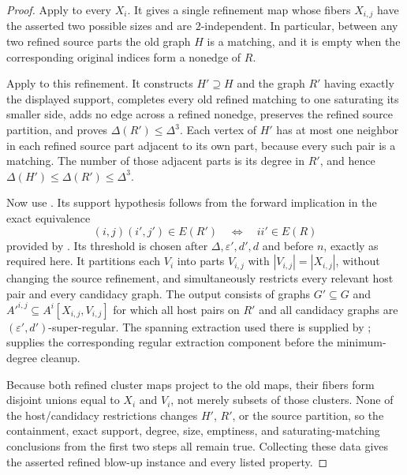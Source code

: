\begin{proof}
Apply  to every $X_i$.  It gives a single refinement map whose fibers $X_{i,j}$ have the asserted two possible sizes and are $2$-independent.  In particular, between any two refined source parts the old graph $H$ is a matching, and it is empty when the corresponding original indices form a nonedge of $R$.

Apply  to this refinement.  It constructs $H'\supseteq H$ and the graph $R'$ having exactly the displayed support, completes every old refined matching to one saturating its smaller side, adds no edge across a refined nonedge, preserves the refined source partition, and proves $\Delta(R')\leq\Delta^3$.  Each vertex of $H'$ has at most one neighbor in each refined source part adjacent to its own part, because every such pair is a matching.  The number of those adjacent parts is its degree in $R'$, and hence $\Delta(H')\leq\Delta(R')\leq\Delta^3$.

Now use .  Its support hypothesis follows from the forward implication in the exact equivalence
\[
 (i,j)(i',j')\in E(R')\quad\Longleftrightarrow\quad ii'\in E(R)
\]
provided by .  Its threshold is chosen after $\Delta,\varepsilon',d',d$ and before $n$, exactly as required here.  It partitions each $V_i$ into parts $V_{i,j}$ with $|V_{i,j}|=|X_{i,j}|$, without changing the source refinement, and simultaneously restricts every relevant host pair and every candidacy graph.  The output consists of graphs $G'\subseteq G$ and $A'^{i,j}\subseteq A^i[X_{i,j},V_{i,j}]$ for which all host pairs on $R'$ and all candidacy graphs are $(\varepsilon',d')$-super-regular.  The spanning extraction used there is supplied by ;  supplies the corresponding regular extraction component before the minimum-degree cleanup.

Because both refined cluster maps project to the old maps, their fibers form disjoint unions equal to $X_i$ and $V_i$, not merely subsets of those clusters.  None of the host/candidacy restrictions changes $H'$, $R'$, or the source partition, so the containment, exact support, degree, size, emptiness, and saturating-matching conclusions from the first two steps all remain true.  Collecting these data gives the asserted refined blow-up instance and every listed property.
\end{proof}
